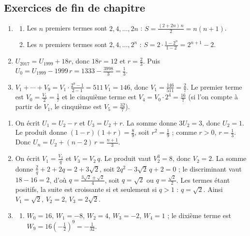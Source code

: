 \begin{corrige}
\subsection*{Exercices de fin de chapitre}
\begin{sol}
\begin{enumerate}
\item \begin{enumerate}
      \item Les $n$ premiers termes sont $2, 4, \ldots, 2n$ : $S = \frac{(2 + 2n)\, n}{2} = n(n+1)$.
      \item Les $n$ premiers termes sont $2, 4, \ldots, 2^n$ : $S = 2 \cdot \frac{1 - 2^n}{1 - 2} = 2^{n+1} - 2$.
      \end{enumerate}
\item $U_{2017} = U_{1999} + 18 r$, donc $18 r = 12$ et $r = \frac{2}{3}$.
      Puis $U_0 = U_{1999} - 1999\, r = 1333 - \frac{3998}{3} = \frac{1}{3}$.
\item $V_1 + \cdots + V_9 = V_1 \cdot \frac{2^9 - 1}{2 - 1} = 511\, V_1 = 146$, donc $V_1 = \frac{146}{511} = \frac{2}{7}$.
      Le premier terme est $V_0 = \frac{V_1}{2} = \frac{1}{7}$ et le cinqui\`eme terme est $V_4 = V_0 \cdot 2^4 = \frac{16}{7}$
      (si l'on compte \`a partir de $V_1$, le cinqui\`eme est $V_5 = \frac{32}{7}$).
\end{enumerate}
\end{sol}
%
\begin{sol}
\begin{enumerate}
\item On \'ecrit $U_1 = U_2 - r$ et $U_3 = U_2 + r$. La somme donne $3U_2 = 3$, donc $U_2 = 1$.
      Le produit donne $(1 - r)(1 + r) = \frac{8}{9}$, soit $r^2 = \frac{1}{9}$ ; comme $r > 0$, $r = \frac{1}{3}$.
      Donc $U_n = U_2 + (n - 2)\, r = \frac{n+1}{3}$.
\item On \'ecrit $V_1 = \frac{V_2}{q}$ et $V_3 = V_2\, q$. Le produit vaut $V_2^3 = 8$, donc $V_2 = 2$.
      La somme donne $\frac{2}{q} + 2 + 2q = 2 + 3\sqrt{2}$, soit $2q^2 - 3\sqrt{2}\, q + 2 = 0$ ;
      le discriminant vaut $18 - 16 = 2$, d'o\`u $q = \frac{3\sqrt{2} \pm \sqrt{2}}{4}$, soit $q = \sqrt{2}$ ou $q = \frac{\sqrt{2}}{2}$.
      Les termes \'etant positifs, la suite est croissante si et seulement si $q > 1$ : $q = \sqrt{2}$.
      Ainsi $V_1 = \sqrt{2}$, $V_2 = 2$, $V_3 = 2\sqrt{2}$.
\item \begin{enumerate}
      \item $W_0 = 16$, $W_1 = -8$, $W_2 = 4$, $W_3 = -2$, $W_4 = 1$ ; le dixi\`eme terme est $W_9 = 16 \left(-\frac{1}{2}\right)^9 = -\frac{1}{32}$.

\end{enumerate}
\end{enumerate}
\end{sol}
\end{corrige}
